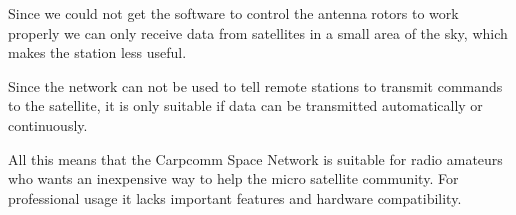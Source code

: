 Since we could not get the software to control the antenna rotors to work properly we can only receive data from satellites in a small area of the sky, which makes the station less useful.

Since the network can not be used to tell remote stations to transmit commands to the satellite, it is only suitable if data can be transmitted automatically or continuously.

All this means that the Carpcomm Space Network is suitable for radio amateurs who wants an inexpensive way to help the micro satellite community. For professional usage it lacks important features and hardware compatibility.







